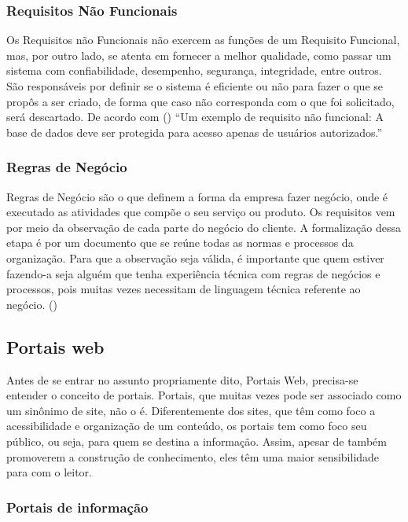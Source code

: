 \subsubsection{Requisitos Não Funcionais}

Os Requisitos não Funcionais não exercem as funções de um Requisito Funcional, mas, por outro lado, se atenta em fornecer a melhor qualidade, como passar um sistema com confiabilidade, desempenho, segurança, integridade, entre outros. São responsáveis por definir se o sistema é eficiente ou não para fazer o que se propôs a ser criado, de forma que caso não corresponda com o que foi solicitado, será descartado. De acordo com (\cite{machado-2011}) “Um exemplo de requisito não funcional: A base de dados deve ser protegida para acesso apenas de usuários autorizados.”

\subsubsection{Regras de Negócio}
Regras de Negócio são o que definem a forma da empresa fazer negócio, onde é executado as atividades que compõe o seu serviço ou produto. Os requisitos vem por meio da observação de cada parte do negócio do cliente. A formalização dessa etapa é por um documento que se reúne todas as normas e processos da organização. Para que a observação seja válida, é importante que quem estiver fazendo-a seja alguém que tenha experiência técnica com regras de negócios e processos, pois muitas vezes necessitam de linguagem técnica referente ao negócio.
(\cite{tecnicas-levantamento})

\subsection{Portais web}
Antes de se entrar no assunto propriamente dito, Portais Web, precisa-se entender o conceito de portais.
Portais, que muitas vezes pode ser associado como um sinônimo de site, não o é. Diferentemente dos sites, que têm como foco a acessibilidade e organização de um conteúdo, os portais tem como foco seu público, ou seja, para quem se destina a informação. Assim, apesar de também promoverem a construção de conhecimento, eles têm uma maior sensibilidade para com o leitor.

\subsubsection{Portais de informação}

